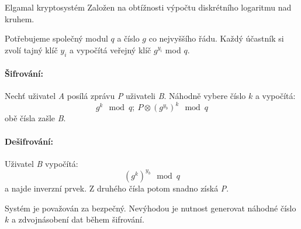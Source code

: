 \begin{obecne}{Elgamal kryptosystém}
  Založen na obtížnosti výpočtu diskrétního logaritmu nad kruhem.

  Potřebujeme společný modul $q$ a číslo $g$ co nejvyššího řádu. Každý účastník si zvolí tajný
  klíč $y_i$ a vypočítá veřejný klíč $g^{y_i}$ mod $q$.
  \paragraph{Šifrování:} Nechť uživatel \emph{A} posílá zprávu \emph{P}
  uživateli \emph{B}. Náhodně
  vybere číslo $k$ a vypočítá: $$ g^k \mod q;\ P \otimes{(g^{y_b})}^k \mod q
  $$ obě čísla zašle \emph{B}.

  \paragraph{Dešifrování:} Uživatel \emph{B} vypočítá: $$ {(g^k)}^{y_b} \mod q$$
  a najde inverzní prvek. Z druhého čísla potom snadno získá \emph{P}.

  Systém je považován za bezpečný. Nevýhodou je nutnost generovat náhodné číslo
  $k$ a zdvojnásobení dat během šifrování.
\end{obecne}
